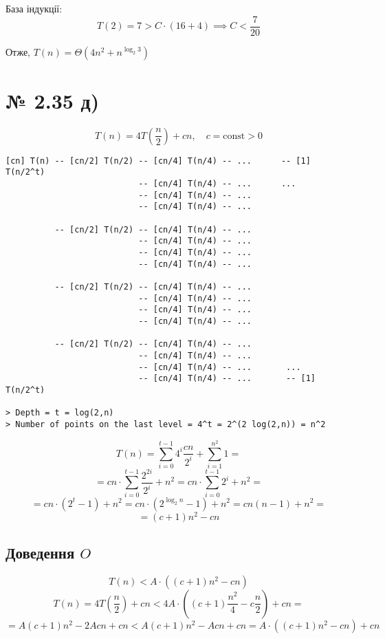 \documentclass[11pt, a4paper]{article} %
\begin{document}
База індукції:
$$T(2) = 7 > C \cdot (16 + 4) \implies C < \frac{7}{20}$$

\begin{mdframed}[style=ans]
    Отже, $T(n) = \Theta(4n^2 + n^{\log_2 3})$
\end{mdframed} 
\pagebreak

\section*{№ 2.35 д)}
$$T(n) = 4T(\frac{n}{2}) + cn, \quad c=\text{const} >0$$

\begin{lstlisting}
[cn] T(n) -- [cn/2] T(n/2) -- [cn/4] T(n/4) -- ...      -- [1] T(n/2^t) 
                           -- [cn/4] T(n/4) -- ...      ...
                           -- [cn/4] T(n/4) -- ...
                           -- [cn/4] T(n/4) -- ...
                           
          -- [cn/2] T(n/2) -- [cn/4] T(n/4) -- ...
                           -- [cn/4] T(n/4) -- ...
                           -- [cn/4] T(n/4) -- ...
                           -- [cn/4] T(n/4) -- ...
                           
          -- [cn/2] T(n/2) -- [cn/4] T(n/4) -- ...
                           -- [cn/4] T(n/4) -- ...
                           -- [cn/4] T(n/4) -- ...
                           -- [cn/4] T(n/4) -- ...
                           
          -- [cn/2] T(n/2) -- [cn/4] T(n/4) -- ...
                           -- [cn/4] T(n/4) -- ...
                           -- [cn/4] T(n/4) -- ...       ...
                           -- [cn/4] T(n/4) -- ...       -- [1] T(n/2^t) 

> Depth = t = log(2,n)
> Number of points on the last level = 4^t = 2^(2 log(2,n)) = n^2
\end{lstlisting}

$$T(n) = \sum_{i=0}^{t-1} 4^i \frac{cn}{2^i} + \sum_{i=1}^{n^2} 1 = $$
$$= cn \cdot \sum_{i=0}^{t-1}  \frac{2^{2i}}{2^i} + n^2 = cn \cdot \sum_{i=0}^{t-1} 2^i + n^2 = $$
$$= cn \cdot (2^t - 1) + n^2 = cn \cdot (2^{\log_2 n} - 1) + n^2 = cn(n - 1) + n^2 = $$
$$= (c+1)n^2 - cn$$

\subsection*{Доведення $O$}
$$T(n) < A \cdot ((c+1)n^2 - cn)$$
$$T(n) = 4T(\frac{n}{2}) + cn < 4A \cdot ((c+1)\frac{n^2}{4} - c\frac{n}{2}) + cn = $$
$$= A(c+1)n^2 - 2Acn + cn < A(c+1)n^2 - Acn + cn = A\cdot ((c+1)n^2 - cn) + cn$$
\end{document}
